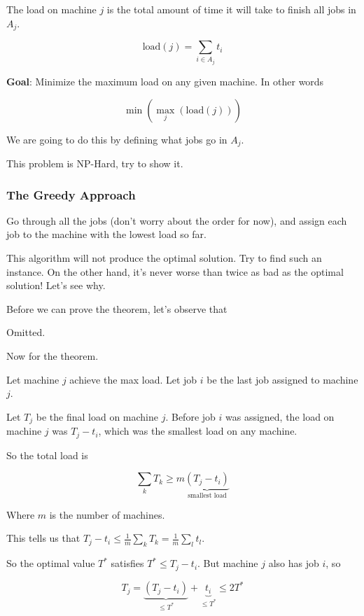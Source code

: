 \documentclass[12pt]{article}
\begin{document}
  The load on machine $j$ is the total amount of time it will take to finish all
  jobs in $A_j$.

  \[
    \text{load}(j) = \sum_{i \in A_j} t_i
  \]

  {\bf Goal}: Minimize the maximum load on any given machine. In other words

  \[
    \min(\max_j (\text{load}(j)))
  \]

  We are going to do this by defining what jobs go in $A_j$.

  This problem is NP-Hard, try to show it.

  \subsubsection{The Greedy Approach}

  Go through all the jobs (don't worry about the order for now), and assign each
  job to the machine with the lowest load so far.

  This algorithm will not produce the optimal solution. Try to find such an
  instance. On the other hand, it's never worse than twice as bad as the optimal
  solution! Let's see why.

  Before we can prove the theorem, let's observe that

  {
    Omitted.
  }

  Now for the theorem.

  {
    Let machine $j$ achieve the max load. Let job $i$ be the last job assigned
    to machine $j$.

    Let $T_j$ be the final load on machine $j$. Before job $i$ was assigned, the
    load on machine $j$ was $T_j - t_i$, which was the smallest load on any
    machine.

    So the total load is

    \[
      \sum_k T_k \ge m \underbrace{(T_j - t_i)}_\text{smallest load}
    \]

    Where $m$ is the number of machines.

    This tells us that $T_j - t_i \le \frac{1}{m} \sum_k T_k = \frac{1}{m}
    \sum_l t_l$.

    So the optimal value $T^*$ satisfies $T^* \le T_j - t_i$. But machine $j$
    also has job $i$, so

    \[
      T_j = \underbrace{(T_j - t_i)}_{\le T^*} + \underbrace{t_i}_{\le T^*} \le 2 T^*
    \]
  }
\end{document}
